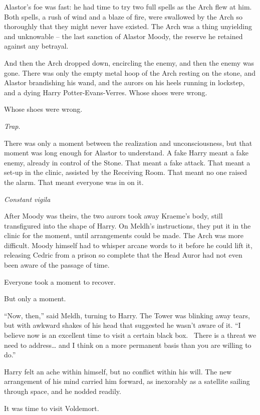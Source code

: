 Alastor's foe was fast: he had time to try two full spells as the Arch
flew at him. Both spells, a rush of wind and a blaze of fire, were
swallowed by the Arch so thoroughly that they might never have existed.
The Arch was a thing unyielding and unknowable -- the last sanction of
Alastor Moody, the reserve he retained against any betrayal.

And then the Arch dropped down, encircling the enemy, and then the enemy
was gone. There was only the empty metal hoop of the Arch resting on the
stone, and Alastor brandishing his wand, and the aurors on his heels
running in lockstep, and a dying Harry Potter-Evans-Verres. Whose shoes
were wrong.

Whose shoes were wrong.

\emph{Trap}.

There was only a moment between the realization and unconsciousness, but
that moment was long enough for Alastor to understand. A fake Harry
meant a fake enemy, already in control of the Stone. That meant a fake
attack. That meant a set-up in the clinic, assisted by the Receiving
Room. That meant no one raised the alarm. That meant everyone was in on
it.

\emph{Constant vigila}

\mybreak

After Moody was theirs, the two aurors took away Kraeme's body, still
transfigured into the shape of Harry. On Meldh's instructions, they put
it in the clinic for the moment, until arrangements could be made. The
Arch was more difficult. Moody himself had to whisper arcane words to it
before he could lift it, releasing Cedric from a prison so complete that
the Head Auror had not even been aware of the passage of time.

Everyone took a moment to recover.

But only a moment.

``Now, then,'' said Meldh, turning to Harry. The Tower was blinking away
tears, but with awkward shakes of his head that suggested he wasn't
aware of it. ``I believe now is an excellent time to visit a certain
black box. ~There is a threat we need to address\ldots{} and I think on
a more permanent basis than you are willing to do.''

Harry felt an ache within himself, but no conflict within his will. The
new arrangement of his mind carried him forward, as inexorably as a
satellite sailing through space, and he nodded readily.

It was time to visit Voldemort.
